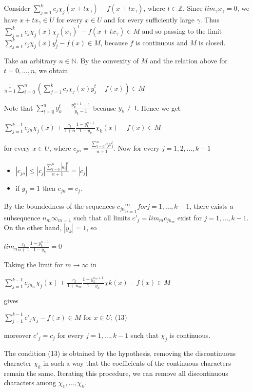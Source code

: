\documentclass[12pt]{article}
\begin{document}
    Consider $\sum^k_{j=1} c_j \chi_j (x + tx_\gamma) - f(x + tx_\gamma)$, where $t \in \mathbb{Z}$. Since $lim_\gamma x_\gamma = 0$, we have $x + tx_\gamma \in U$ for every
$x \in U$ and for every sufficiently large $\gamma$. Thus $\sum^k_{j=1} c_j \chi_j (x)\chi_j (x_\gamma)^t - f(x + tx_\gamma) \in M$ and so passing to the
limit $\sum^k_{j=1} c_j \chi_j (x)y^t_j - f(x) \in M$, because $f$ is continuous and $M$ is closed.


    Take an arbitrary $n \in \mathbb{N}$. By the convexity of $M$ and the relation above for $t = 0, . . . , n$, we obtain


    $\frac{1}{n+1} \sum^n_{t=0} (\sum^k_{j=1}c_j \chi_j (x)y^t_j - f(x)) \in M$


Note that $\sum^n_{t=0} y^t_k = \frac{y^{n+1}_k - 1}{y_k - 1}$ because $y_k \neq 1$. Hence we get


    $\sum^{k-1}_{j=1} c_{jn} \chi_j (x) + \frac{c_k}{1+n} \frac{1-y^{n+1}_k}{1-y_k} \chi_k (x) - f(x) \in M$


for every $x \in U$, where $c_{jn} = \frac{\sum^n_{t=0} c_j y^t_j}{n+1}$. Now for every $j=1,2,...,k-1$


\begin{itemize}

    \item $|c_{jn}| \leq |c_j| \frac{\sum^n_{t=0} |y_j|^t}{n+1} = |c_j|$

    \item if $y_j=1$ then $c_{jn}=c_j$.

\end{itemize}


By the boundedness of the sequences ${c_{jn}}^\infty_{n=1} for j = 1, . . . , k - 1$, there exists a subsequence ${n_m}\infty_{m=1}$ such
that all limits $c'_j = lim_m c_{jn_m}$ exist for $j = 1, . . . , k - 1$. On the other hand, $|y_k| = 1$, so


    $lim_n \frac{c_k}{n+1} \frac{1-y^{n+1}_k}{1-y_k} = 0$


Taking the limit for $m \to \infty$ in


    $\sum^{k-1}_{j=1} c_{jn_m} \chi_j (x) + \frac{c_k}{1+n_m} \frac{1-y^{n_m+1}_k}{1-y_k} \chi k(x)-f(x) \in M$


gives


    $\sum^{k-1}_{j=1} c'_j \chi_j -f(x) \in M$ for $x \in U$; (13)


moreover $c'_j = c_j$ for every $j = 1, . . . , k - 1$ such that $\chi_j$ is continuous.


    The condition (13) is obtained by the hypothesis, removing the discontinuous character $\chi_k$ in such a way
that the coefficients of the continuous characters remain the same. Iterating this procedure, we can remove all
discontinuous characters among $\chi_1, . . . , \chi_k$.
\end{document}
